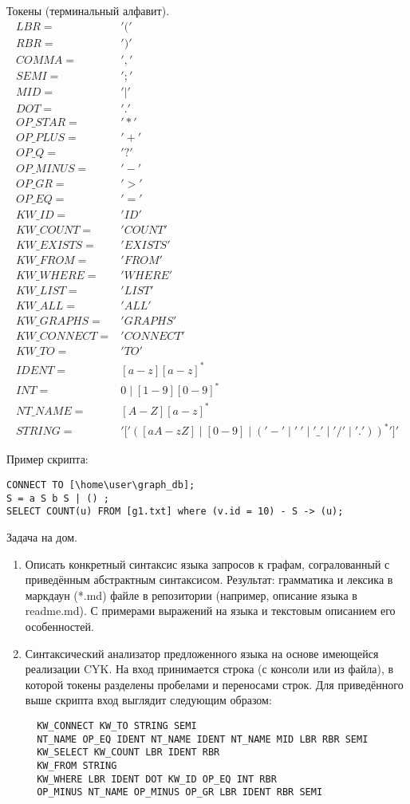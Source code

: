Токены (терминальный алфавит).
\begin{align*}
LBR = & '(' \\
RBR = & ')' \\
COMMA = & ',' \\
SEMI = & ';' \\
MID = & '|' \\
DOT = & '.' \\
OP\_STAR = & '*' \\ 
OP\_PLUS = & '+' \\
OP\_Q = & '?' \\
OP\_MINUS = & '-' \\
OP\_GR = & '>' \\
OP\_EQ = & '=' \\
KW\_ID = & 'ID' \\
KW\_COUNT = & 'COUNT' \\
KW\_EXISTS = & 'EXISTS' \\
KW\_FROM = & 'FROM' \\
KW\_WHERE = & 'WHERE' \\
KW\_LIST = & 'LIST' \\
KW\_ALL = & 'ALL' \\
KW\_GRAPHS = & 'GRAPHS' \\
KW\_CONNECT = & 'CONNECT' \\
KW\_TO = & 'TO' \\
IDENT = & [a-z][a-z]^* \\
INT = & 0 \mid [1-9][0-9]^* \\
NT\_NAME = & [A-Z][a-z]^* \\
STRING = & {'['} ([aA-zZ] \mid [0-9] \mid ({'-'} \mid {' \ '} \mid {'\_'} \mid {'/'} \mid {'.'}))^* {']'}
\end{align*}

Пример скрипта:
\begin{verbatim}
CONNECT TO [\home\user\graph_db];
S = a S b S | () ;
SELECT COUNT(u) FROM [g1.txt] where (v.id = 10) - S -> (u);
\end{verbatim}

Задача на дом.
\begin{enumerate}
  \item Описать конкретный синтаксис языка запросов к графам, согралованный с приведённым абстрактным синтаксисом. Результат: грамматика и лексика в маркдаун (*.md) файле в репозитории (например, описание языка в readme.md). С примерами выражений на языка и текстовым описанием его особенностей.
  \item Синтаксический анализатор предложенного языка на основе имеющейся реализации CYK. На вход принимается строка (с консоли или из файла), в которой токены разделены пробелами и переносами строк. Для приведённого выше скрипта вход выглядит следующим образом:
  \begin{verbatim}
  KW_CONNECT KW_TO STRING SEMI 
  NT_NAME OP_EQ IDENT NT_NAME IDENT NT_NAME MID LBR RBR SEMI 
  KW_SELECT KW_COUNT LBR IDENT RBR 
  KW_FROM STRING 
  KW_WHERE LBR IDENT DOT KW_ID OP_EQ INT RBR 
  OP_MINUS NT_NAME OP_MINUS OP_GR LBR IDENT RBR SEMI
  \end{verbatim}
\end{enumerate}





